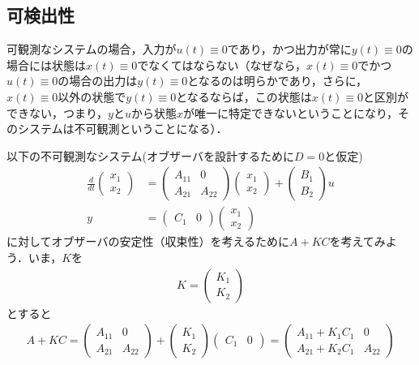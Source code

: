 \subsection{可検出性}

可観測なシステムの場合，入力が$u(t) \equiv 0$であり，かつ出力が常に$y(t)\equiv 0$の場合には状態は$x(t) \equiv 0$でなくてはならない（なぜなら，$x(t) \equiv 0$でかつ$u(t) \equiv 0$の場合の出力は$y(t) \equiv 0$となるのは明らかであり，さらに，$x(t) \equiv 0$以外の状態で$y(t) \equiv 0$となるならば，この状態は$x(t)\equiv 0$と区別ができない，つまり，$y$と$u$から状態$x$が唯一に特定できないということになり，そのシステムは不可観測ということになる）．

以下の不可観測なシステム(オブザーバを設計するために$D=0$と仮定)
\begin{align}
 \frac{d}{dt}
  \left(\begin{array}{c}
         {x}_1 \\
	 {x}_2 
	\end{array}\right)
  &=
  \left(\begin{array}{cc}
         {A}_{11} & 0 \\
	     {A}_{21} & {A}_{22}
	\end{array}\right)
  \left(\begin{array}{c}
         {x}_1 \\
	 {x}_2 
	\end{array}\right)
  +
  \left(\begin{array}{c}
         {B}_1 \\
	 {B}_2
	\end{array}\right)
  u 
 \\
 y &=
  \left(\begin{array}{cc}
         {C}_1 & 0
	\end{array}\right)
  \left(\begin{array}{c}
         {x}_1 \\
	 {x}_2 
	\end{array}\right)
\end{align}
に対してオブザーバの安定性（収束性）を考えるために$A+KC$を考えてみよう．いま，$K$を
\begin{align}
	K=
	\left(	\begin{array}{c}
			K_1 \\
			K_2
		\end{array} \right)
\end{align}
とすると
\begin{align}
	A+KC= 
	  \left(\begin{array}{cc}
        	{A}_{11} & 0 \\
	     	{A}_{21} & {A}_{22}
		\end{array}\right)
	+ \left(\begin{array}{c}
			K_1 \\
			K_2
		\end{array} \right)
	  \left(\begin{array}{cc}
	         {C}_1 & 0
		\end{array}\right)
	=\left(\begin{array}{cc}
        	{A}_{11} + K_1 C_1 & 0 \\
	     	{A}_{21} + K_2 C_1& {A}_{22}
		\end{array}\right)
\end{align}

